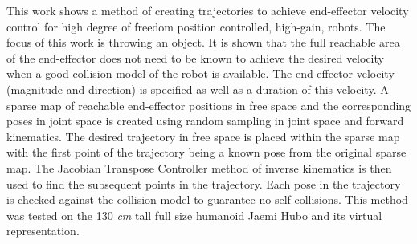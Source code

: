 This work shows a method of creating trajectories to achieve end-effector velocity control for high degree of freedom position controlled, high-gain, robots.  The focus of this work is throwing an object.  It is shown that the full reachable area of the end-effector does not need to be known to achieve the desired velocity when a good collision model of the robot is available.  The end-effector velocity (magnitude and direction) is specified as well as a duration of this velocity.  A sparse map of reachable end-effector positions in free space and the corresponding poses in joint space is created using random sampling in joint space and forward kinematics.  The desired trajectory in free space is placed within the sparse map with the first point of the trajectory being a known pose from the original sparse map.  The Jacobian Transpose Controller method of inverse kinematics is then used to find the subsequent points in the trajectory.  Each pose in the trajectory is checked against the collision model to guarantee no self-collisions.  This method was tested on the 130 \textit{cm} tall full size humanoid Jaemi Hubo and its virtual representation.